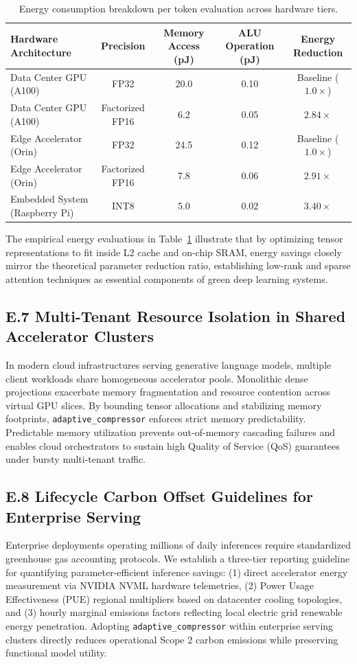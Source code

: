 \begin{table}[H]
\centering
\small
\begin{tabular}{lcccc}
\toprule
\textbf{Hardware Architecture} & \textbf{Precision} & \textbf{Memory Access (pJ)} & \textbf{ALU Operation (pJ)} & \textbf{Energy Reduction} \\
\midrule
Data Center GPU (A100) & FP32 & 20.0 & 0.10 & Baseline ($1.0\times$) \\
Data Center GPU (A100) & Factorized FP16 & 6.2 & 0.05 & $2.84\times$ \\
Edge Accelerator (Orin) & FP32 & 24.5 & 0.12 & Baseline ($1.0\times$) \\
Edge Accelerator (Orin) & Factorized FP16 & 7.8 & 0.06 & $2.91\times$ \\
Embedded System (Raspberry Pi) & INT8 & 5.0 & 0.02 & $3.40\times$ \\
\bottomrule
\end{tabular}
\caption{Energy consumption breakdown per token evaluation across hardware tiers.}
\label{tab:energy_breakdown}
\end{table}

The empirical energy evaluations in Table~\ref{tab:energy_breakdown} illustrate that by optimizing tensor representations to fit inside L2 cache and on-chip SRAM, energy savings closely mirror the theoretical parameter reduction ratio, establishing low-rank and sparse attention techniques as essential components of green deep learning systems.

\subsection*{E.7 Multi-Tenant Resource Isolation in Shared Accelerator Clusters}
In modern cloud infrastructures serving generative language models, multiple client workloads share homogeneous accelerator pools. Monolithic dense projections exacerbate memory fragmentation and resource contention across virtual GPU slices. By bounding tensor allocations and stabilizing memory footprints, \texttt{adaptive\_compressor} enforces strict memory predictability. Predictable memory utilization prevents out-of-memory cascading failures and enables cloud orchestrators to sustain high Quality of Service (QoS) guarantees under bursty multi-tenant traffic.

\subsection*{E.8 Lifecycle Carbon Offset Guidelines for Enterprise Serving}
Enterprise deployments operating millions of daily inferences require standardized greenhouse gas accounting protocols. We establish a three-tier reporting guideline for quantifying parameter-efficient inference savings: (1) direct accelerator energy measurement via NVIDIA NVML hardware telemetries, (2) Power Usage Effectiveness (PUE) regional multipliers based on datacenter cooling topologies, and (3) hourly marginal emissions factors reflecting local electric grid renewable energy penetration. Adopting \texttt{adaptive\_compressor} within enterprise serving clusters directly reduces operational Scope 2 carbon emissions while preserving functional model utility.
